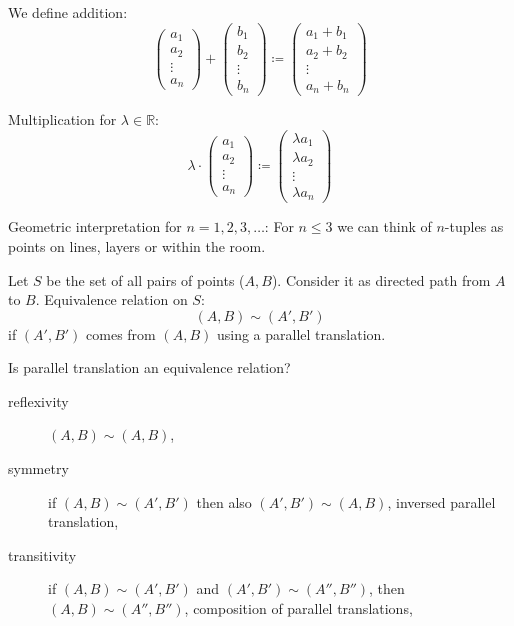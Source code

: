\documentclass[a4paper,landscape,twocolumn]{article}
\begin{document}
We define addition:
\[
  \begin{pmatrix} a_1 \\ a_2 \\ \vdots \\ a_n \end{pmatrix} +
  \begin{pmatrix} b_1 \\ b_2 \\ \vdots \\ b_n \end{pmatrix} \coloneqq
  \begin{pmatrix} a_1 + b_1 \\ a_2 + b_2 \\ \vdots \\ a_n + b_n \end{pmatrix}
\]

Multiplication for $\lambda \in \mathbb{R}$:
\[
    \lambda \cdot \begin{pmatrix} a_1 \\ a_2 \\ \vdots \\ a_n \end{pmatrix} \coloneqq
    \begin{pmatrix} \lambda a_1 \\ \lambda a_2 \\ \vdots \\ \lambda a_n \end{pmatrix}
\]

Geometric interpretation for $n=1,2,3,\ldots$:
  For $n \leq 3$ we can think of $n$-tuples as points on lines, layers or within the room.

Let $S$ be the set of all pairs of points ($A, B$). Consider it as directed path from $A$ to $B$.
Equivalence relation on $S$:
\[ (A, B) \sim (A', B') \]
if $(A', B')$ comes from $(A, B)$ using a parallel translation.

Is parallel translation an equivalence relation?
\begin{description}
  \item[reflexivity]
    $(A, B) \sim (A, B)$, \checkmark
  \item[symmetry]
    if $(A, B) \sim (A', B')$ then also $(A', B') \sim (A, B)$,
    inversed parallel translation,
    \checkmark
  \item[transitivity]
    if $(A, B) \sim (A', B')$ and $(A', B') \sim (A'', B'')$, then $(A, B) \sim (A'', B'')$,
    composition of parallel translations, \checkmark
\end{description}
\end{document}
